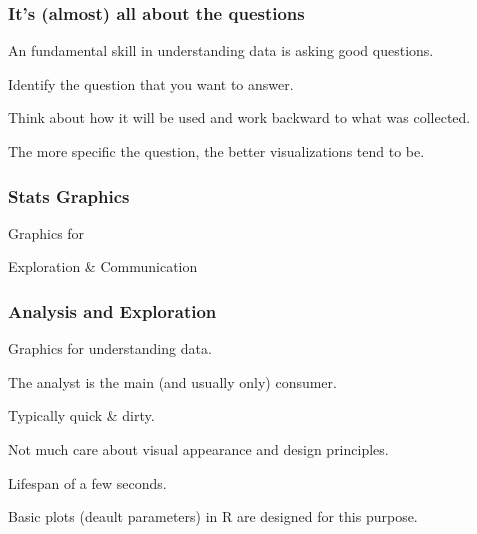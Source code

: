 \documentclass[12pt]{beamer}\usepackage[]{graphicx}\usepackage[]{color}
\begin{document}

\begin{frame}
\frametitle{It's (almost) all about the questions}

\bbi
  \item An fundamental skill in understanding data is asking good questions.
  \item Identify the question that you want to answer.
  \item Think about how it will be used and work backward to what was collected.
  \item The more specific the question, the better visualizations tend to be.
\ei

\end{frame}


\begin{frame}
\begin{center}
\Huge{}
\end{center}
\end{frame}


\begin{frame}
\frametitle{Stats Graphics}

\centerline{\mdlit \Large Graphics for}

\bigskip
\centerline{\Large Exploration \quad \& \quad Communication}

\end{frame}


\begin{frame}
\frametitle{Analysis and Exploration}

\bbi
  \item Graphics for understanding data.
  \item The analyst is the main (and usually only) consumer.
  \item Typically quick \& dirty.
  \item Not much care about visual appearance and design principles.
  \item Lifespan of a few seconds.
  \item Basic plots (deault parameters) in R are designed for this purpose.
\ei
\eb

\end{frame}
\end{document}
